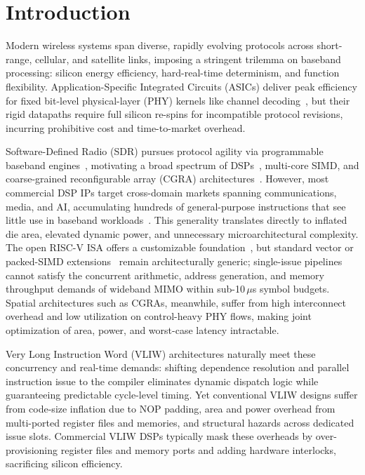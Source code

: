\documentclass[9pt,conference]{IEEEtran}
\begin{document}
\section{Introduction}
Modern wireless systems span diverse, rapidly evolving protocols across short-range, cellular, and satellite links, imposing a stringent trilemma on baseband processing: silicon energy efficiency, hard-real-time determinism, and function flexibility. Application-Specific Integrated Circuits (ASICs) deliver peak efficiency for fixed bit-level physical-layer (PHY) kernels like channel decoding~\cite{shao2019survey}, but their rigid datapaths require full silicon re-spins for incompatible protocol revisions, incurring prohibitive cost and time-to-market overhead.

Software-Defined Radio (SDR) pursues protocol agility via programmable baseband engines~\cite{sinha2016software, akeela2018software}, motivating a broad spectrum of DSPs~\cite{anjum2011state, liu2009bridging, moudgill2008sandblaster, highefficient, ziyuan2013100}, multi-core SIMD, and coarse-grained reconfigurable array (CGRA) architectures~\cite{lin2007soda, woh2008soda, bougard2008coarse, wu2023alleviating}. However, most commercial DSP IPs target cross-domain markets spanning communications, media, and AI, accumulating hundreds of general-purpose instructions that see little use in baseband workloads~\cite{amor2021risc}. This generality translates directly to inflated die area, elevated dynamic power, and unnecessary microarchitectural complexity. The open RISC-V ISA offers a customizable foundation~\cite{cui2023risc}, but standard vector or packed-SIMD extensions~\cite{razilov2022communications, li2023portable} remain architecturally generic; single-issue pipelines cannot satisfy the concurrent arithmetic, address generation, and memory throughput demands of wideband MIMO within sub-10\,$\mu$s symbol budgets. Spatial architectures such as CGRAs, meanwhile, suffer from high interconnect overhead and low utilization on control-heavy PHY flows, making joint optimization of area, power, and worst-case latency intractable.

Very Long Instruction Word (VLIW) architectures naturally meet these concurrency and real-time demands: shifting dependence resolution and parallel instruction issue to the compiler eliminates dynamic dispatch logic while guaranteeing predictable cycle-level timing. Yet conventional VLIW designs suffer from code-size inflation due to NOP padding, area and power overhead from multi-ported register files and memories, and structural hazards across dedicated issue slots. Commercial VLIW DSPs typically mask these overheads by over-provisioning register files and memory ports and adding hardware interlocks, sacrificing silicon efficiency.
\end{document}
